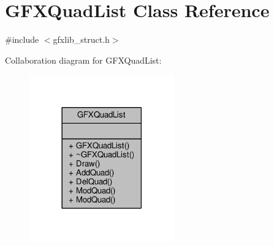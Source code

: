 \hypertarget{classGFXQuadList}{}\section{G\+F\+X\+Quad\+List Class Reference}
\label{classGFXQuadList}


{\ttfamily \#include $<$gfxlib\+\_\+struct.\+h$>$}



Collaboration diagram for G\+F\+X\+Quad\+List\+:
\nopagebreak
\begin{figure}[H]
\begin{center}
\leavevmode
\includegraphics[width=177pt]{d0/d11/classGFXQuadList__coll__graph}
\end{center}
\end{figure}
